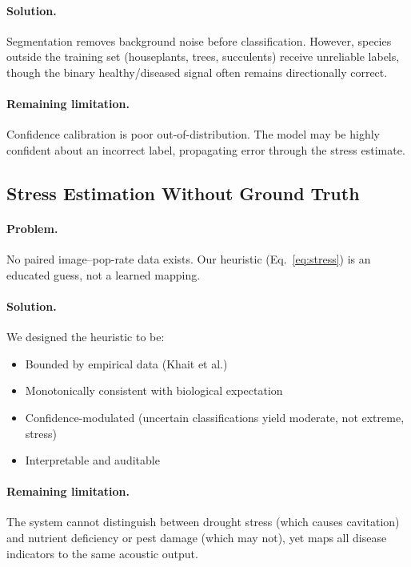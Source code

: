 \documentclass[11pt,a4paper,twocolumn]{article}
\begin{document}
\paragraph{Solution.} Segmentation removes background noise before classification. However, species outside the training set (houseplants, trees, succulents) receive unreliable labels, though the binary healthy/diseased signal often remains directionally correct.

\paragraph{Remaining limitation.} Confidence calibration is poor out-of-distribution. The model may be highly confident about an incorrect label, propagating error through the stress estimate.

\subsection{Stress Estimation Without Ground Truth}

\paragraph{Problem.} No paired image--pop-rate data exists. Our heuristic (Eq.~\ref{eq:stress}) is an educated guess, not a learned mapping.

\paragraph{Solution.} We designed the heuristic to be:
\begin{itemize}[nosep]
    \item Bounded by empirical data (Khait et al.)
    \item Monotonically consistent with biological expectation
    \item Confidence-modulated (uncertain classifications yield moderate, not extreme, stress)
    \item Interpretable and auditable
\end{itemize}

\paragraph{Remaining limitation.} The system cannot distinguish between drought stress (which causes cavitation) and nutrient deficiency or pest damage (which may not), yet maps all disease indicators to the same acoustic output.
\end{document}
